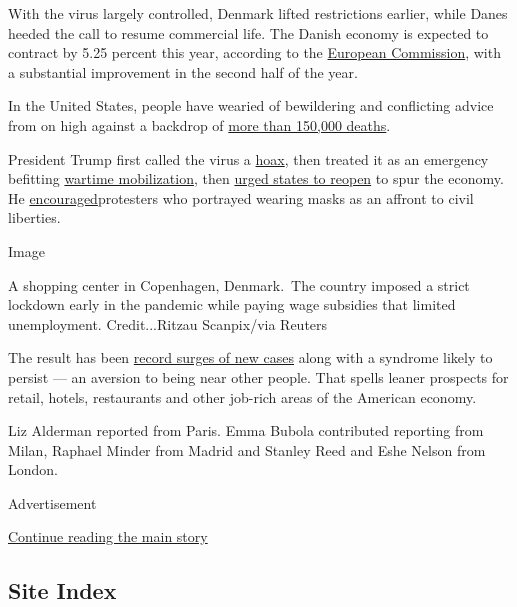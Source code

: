 With the virus largely controlled, Denmark lifted restrictions earlier,
while Danes heeded the call to resume commercial life. The Danish
economy is expected to contract by 5.25 percent this year, according to
the
\href{https://ec.europa.eu/economy_finance/forecasts/2020/summer/ecfin_forecast_summer_2020_dk_en.pdf}{European
Commission}, with a substantial improvement in the second half of the
year.

In the United States, people have wearied of bewildering and conflicting
advice from on high against a backdrop of
\href{https://www.nytimes.com/2020/07/29/us/coronavirus-deaths-150000.html}{more
than 150,000 deaths}.

President Trump first called the virus a
\href{https://www.nytimes.com/2020/02/28/us/politics/trump-accuses-media-democrats-coronavirus.html}{hoax},
then treated it as an emergency befitting
\href{https://www.nytimes.com/2020/03/22/us/politics/coronavirus-trump-wartime-president.html}{wartime
mobilization}, then
\href{https://www.nytimes.com/2020/04/16/us/politics/coronavirus-trump-guidelines.html}{urged
states to reopen} to spur the economy. He
\href{https://www.nytimes.com/2020/04/17/us/politics/trump-coronavirus-governors.html}{encouraged}protesters
who portrayed wearing masks as an affront to civil liberties.

Image

A shopping center in Copenhagen, Denmark.~The country imposed a strict
lockdown early in the pandemic while paying wage subsidies that limited
unemployment. Credit...Ritzau Scanpix/via Reuters

The result has been
\href{https://www.nytimes.com/2020/07/25/world/coronavirus-covid-19.html}{record
surges of new cases} along with a syndrome likely to persist --- an
aversion to being near other people. That spells leaner prospects for
retail, hotels, restaurants and other job-rich areas of the American
economy.

Liz Alderman reported from Paris. Emma Bubola contributed reporting from
Milan, Raphael Minder from Madrid and Stanley Reed and Eshe Nelson from
London.

Advertisement

\protect\hyperlink{after-bottom}{Continue reading the main story}

\hypertarget{site-index}{%
\subsection{Site Index}\label{site-index}}

